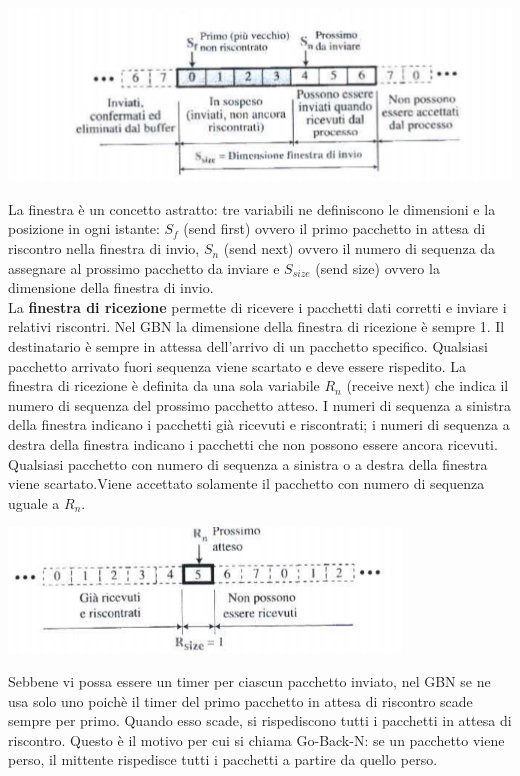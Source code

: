 \documentclass[12pt]{report}
\begin{document}
	\begin{center}
		\includegraphics[scale=0.7]{assets/gbn.png}
	\end{center}
	La finestra è un concetto astratto: tre variabili ne definiscono le dimensioni e la posizione in ogni istante: $S_f$ (send first) ovvero il primo pacchetto in attesa di riscontro nella finestra di invio, $S_n$ (send next) ovvero il numero di sequenza da assegnare al prossimo pacchetto da inviare e $S_{size}$ (send size) ovvero la dimensione della finestra di invio.
	\vspace{\baselineskip}\\
	La \textbf{finestra di ricezione} permette di ricevere i pacchetti dati corretti e inviare i relativi riscontri. Nel GBN la dimensione della finestra di ricezione è sempre 1. Il destinatario è sempre in attessa dell'arrivo di un pacchetto specifico. Qualsiasi pacchetto arrivato fuori sequenza viene scartato e deve essere rispedito. La finestra di ricezione è definita da una sola variabile $R_n$ (receive next) che indica il numero di sequenza del prossimo pacchetto atteso. I numeri di sequenza a sinistra della finestra indicano i pacchetti già ricevuti e riscontrati; i numeri di sequenza a destra della finestra indicano i pacchetti che non possono essere ancora ricevuti. Qualsiasi pacchetto con numero di sequenza a sinistra o a destra della finestra viene scartato.Viene accettato solamente il pacchetto con numero di sequenza uguale a $R_n$.
	\begin{center}
		\includegraphics[scale=0.7]{assets/gbn2.png}		
	\end{center}
	Sebbene vi possa essere un timer per ciascun pacchetto inviato, nel GBN se ne usa solo uno poichè il timer del primo pacchetto in attesa di riscontro scade sempre per primo. Quando esso scade, si rispediscono tutti i pacchetti in attesa di riscontro. Questo è il motivo per cui si chiama Go-Back-N: se un pacchetto viene perso, il mittente rispedisce tutti i pacchetti a partire da quello perso.
\end{document}
